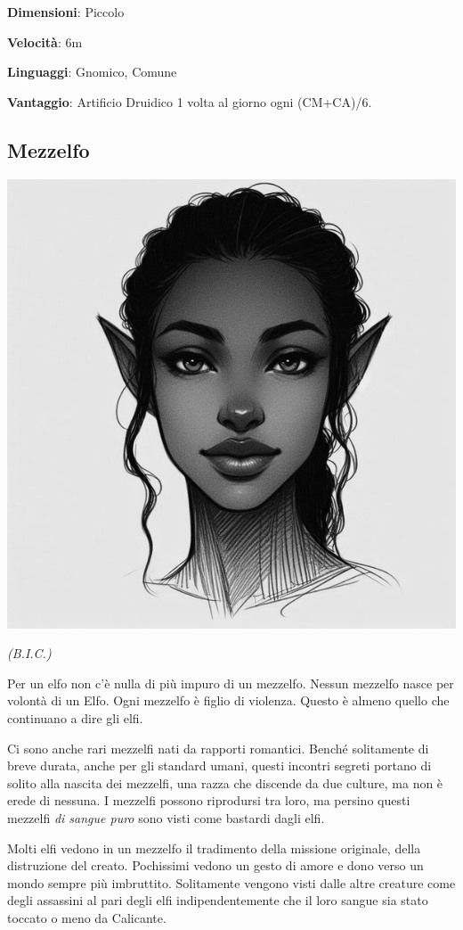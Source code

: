 \begin{multicols}{2}
\textbf{Dimensioni}: Piccolo

\textbf{Velocità}: 6m

\textbf{Linguaggi}: Gnomico, Comune

\textbf{Vantaggio}: Artificio Druidico 1 volta al giorno ogni (CM+CA)/6.

\subsection{Mezzelfo}\label{mezzelfo}

\begin{center}
\includegraphics[height=0.7\linewidth]{immagini/halfelf3_grayscale-ai.png}

\emph{(B.I.C.)}
\end{center}

Per un elfo non c'è nulla di più impuro di un mezzelfo. Nessun mezzelfo nasce per volontà di un Elfo. Ogni mezzelfo è figlio di violenza. Questo è almeno quello che continuano a dire gli elfi.

Ci sono anche rari mezzelfi nati da rapporti romantici. Benché solitamente di breve durata, anche per gli standard umani, questi incontri segreti portano di solito alla nascita dei mezzelfi, una razza che discende da due culture, ma non è erede di nessuna. I mezzelfi possono riprodursi tra loro, ma persino questi mezzelfi \emph{di sangue puro} sono visti come bastardi dagli elfi.

Molti elfi vedono in un mezzelfo il tradimento della missione originale, della distruzione del creato.
Pochissimi vedono un gesto di amore e dono verso un mondo sempre più imbruttito.
Solitamente vengono visti dalle altre creature come degli assassini al pari degli elfi indipendentemente che il loro sangue sia stato toccato o meno da Calicante.


\end{multicols}
